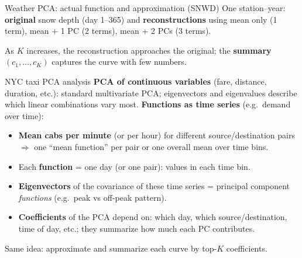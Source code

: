 \documentclass[aspectratio=169]{beamer}
\begin{document}
\begin{frame}{Weather PCA: actual function and approximation (SNWD)}
  \small
  One station--year: \textbf{original} snow depth (day 1--365) and \textbf{reconstructions} using mean only (1 term), mean + 1 PC (2 terms), mean + 2 PCs (3 terms).
  \vspace{0.2cm}
  \begin{center}
  \end{center}
  As $K$ increases, the reconstruction approaches the original; the \textbf{summary} $(c_1,\ldots,c_K)$ captures the curve with few numbers.
\end{frame}

\begin{frame}{NYC taxi PCA analysis}
  \small
  \textbf{PCA of continuous variables} (fare, distance, duration, etc.): standard multivariate PCA; eigenvectors and eigenvalues describe which linear combinations vary most.
  \vspace{0.2cm}
  \textbf{Functions as time series} (e.g.\ demand over time):
  \begin{itemize}
    \item \textbf{Mean cabs per minute} (or per hour) for different source/destination pairs $\Rightarrow$ one ``mean function'' per pair or one overall mean over time bins.
    \item Each \textbf{function} = one day (or one pair): values in each time bin.
    \item \textbf{Eigenvectors} of the covariance of these time series = principal component \emph{functions} (e.g.\ peak vs off-peak pattern).
    \item \textbf{Coefficients} of the PCA depend on: which day, which source/destination, time of day, etc.; they summarize how much each PC contributes.
  \end{itemize}
  \vspace{0.15cm}
  Same idea: approximate and summarize each curve by top-$K$ coefficients.
\end{frame}
\end{document}
